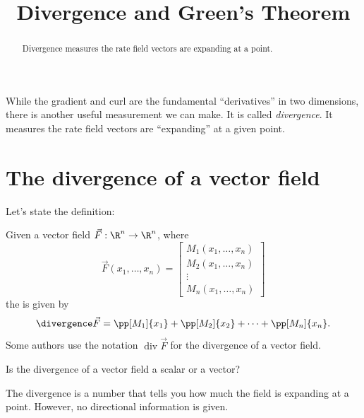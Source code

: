 \documentclass{ximera}
\title[Dig-In:]{Divergence and Green's Theorem}
\begin{document}
\begin{abstract}
  Divergence measures the rate field vectors are expanding at a point.
\end{abstract}
\maketitle

While the gradient and curl are the fundamental ``derivatives'' in two
dimensions, there is another useful measurement we can make. It is
called \textit{divergence}. It measures the rate field vectors are
``expanding'' at a given point.

\section{The divergence of a vector field}

Let's state the definition:

\begin{definition}
  Given a vector field $\vec{F}:\R^n\to \R^n$, where
  \[
  \vec{F}(x_1,\dots,x_n) = \begin{bmatrix}
    M_1(x_1,\dots,x_n)\\
    M_2(x_1,\dots,x_n)\\
    \vdots \\
    M_n(x_1,\dots,x_n)
  \end{bmatrix}
  \]
  the  is given by
  \[
  \divergence \vec F =\pp[M_1]{x_1} + \pp[M_2]{x_2} + \dots + \pp[M_n]{x_n}. 
  \]
  Some authors use the notation $\mathop{\mathrm{div}}\vec{F}$ for the
  divergence of a vector field.
\end{definition}

\begin{question}
  Is the divergence of a vector field a scalar or a vector?
  \begin{prompt}
  \begin{multipleChoice}
  \end{multipleChoice}
  \begin{feedback}
    The divergence is a number that tells you how much the field is
    expanding at a point. However, no directional information is
    given.
  \end{feedback}
  \end{prompt}
\end{question}
\end{document}
